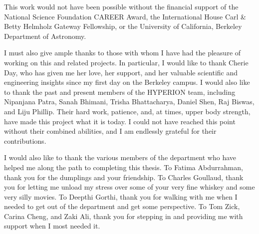 \documentclass[masters]{ucbthesis}
\begin{document}
\begin{frontmatter}

\begin{dedication}
\null\vfil
\begin{center}
\end{center}
\vfil\null
\end{dedication}


\tableofcontents
\clearpage
\listoffigures
\clearpage

\begin{acknowledgements}
 This work would not have been possible without the financial support of the 
 National Science Foundation CAREER Award, the International House Carl \& 
 Betty Helmholz Gateway Fellowship, or the University of California, Berkeley 
 Department of Astronomy. 

 I must also give ample thanks to those with whom I have had the pleasure of 
 working on this and related projects. In particular, I would like to thank 
 Cherie Day, who has given me her love, her support, and her valuable 
 scientific and engineering insights since my first day on the Berkeley campus.  
 I would also like to thank the past and present members of the HYPERION team, 
 including Nipanjana Patra, Sanah Bhimani, Trisha Bhattacharya, Daniel Shen, 
 Raj Biswas, and Liju Phillip. Their hard work, patience, and, at times, upper 
 body strength, have made this project what it is today.  I could not have 
 reached this point without their combined abilities, and I am endlessly 
 grateful for their contributions.

 I would also like to thank the various members of the department who have 
 helped me along the path to completing this thesis. To Fatima Abdurrahman, 
 thank you for the dumplings and your friendship. To Charles Goullaud, thank 
 you for letting me unload my stress over some of your very fine whiskey and 
 some very silly movies. To Deepthi Gorthi, thank you for walking with me when 
 I needed to get out of the department and get some perspective. To Tom Zick, 
 Carina Cheng, and Zaki Ali, thank you for stepping in and providing me with 
 support when I most needed it.


\end{acknowledgements}
\end{frontmatter}
\end{document}
